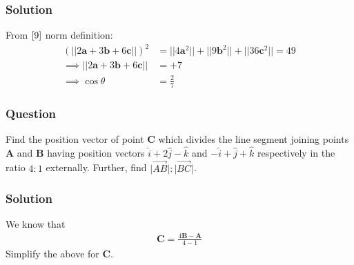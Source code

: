 \documentclass{beamer}
\providecommand{\brak}[1]{\ensuremath{\left(#1\right)}}
\theoremstyle{remark}
\let\vec\mathbf
\begin{document}
\begin{frame}
\frametitle{Solution}
From $\eqref{9}$ norm definition:
    \begin{align}
        \brak{\lvert \lvert 2\vec{a} + 3\vec{b} + 6\vec{c} \rvert \rvert}^2 &= \lvert \lvert 4\vec{a}^2 \rvert \rvert + \lvert \lvert 9\vec{b}^2 \rvert \rvert + \lvert \lvert 36\vec{c}^2  \rvert \rvert = 49\\
    \implies \lvert \lvert 2\vec{a} + 3\vec{b} + 6\vec{c} \rvert \rvert &= +7\\
    \implies \cos{\theta} &= \frac{2}{7}
\end{align}
    
\end{frame}







\begin{frame}
\frametitle{Question }
Find the position vector of point $\vec{C}$ which divides the line segment joining points $\vec{A}$ and $\vec{B}$ having position vectors $\hat{i} + 2\hat{j} - \hat{k}$ and $-\hat{i} + \hat{j} + \hat{k}$ respectively in the ratio $4:1$ externally. Further, find $\lvert \overrightarrow{AB}\rvert : \lvert \overrightarrow{BC} \rvert$. 
\end{frame}





\begin{frame}
\frametitle{Solution}
We know that
\begin{align}
\vec{C} = \frac{4\vec{B}-\vec{A}}{4-1}
\end{align}
Simplify the above for $\vec{C}$. 
    
\end{frame}
\end{document}
